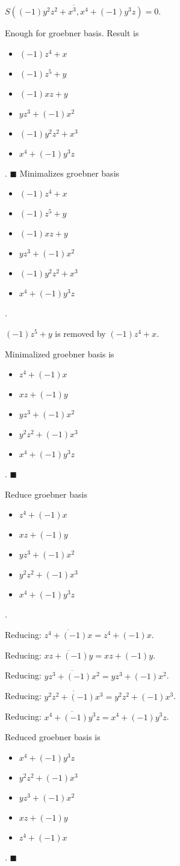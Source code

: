 $\overline{S((-1)y^{2}z^{2}+x^{3}, x^{4}+(-1)y^{3}z)} = 0$.

Enough for groebner basis.  Result is \begin{itemize}
\item $(-1)z^{4}+x$
\item $(-1)z^{5}+y$
\item $(-1)xz+y$
\item $yz^{3}+(-1)x^{2}$
\item $(-1)y^{2}z^{2}+x^{3}$
\item $x^{4}+(-1)y^{3}z$
\end{itemize}  .
$\blacksquare{}$
Minimalizes groebner basis
\begin{itemize}
\item $(-1)z^{4}+x$
\item $(-1)z^{5}+y$
\item $(-1)xz+y$
\item $yz^{3}+(-1)x^{2}$
\item $(-1)y^{2}z^{2}+x^{3}$
\item $x^{4}+(-1)y^{3}z$
\end{itemize}  .


$(-1)z^{5}+y$ is removed by $(-1)z^{4}+x$.

Minimalized groebner basis is
\begin{itemize}
\item $z^{4}+(-1)x$
\item $xz+(-1)y$
\item $yz^{3}+(-1)x^{2}$
\item $y^{2}z^{2}+(-1)x^{3}$
\item $x^{4}+(-1)y^{3}z$
\end{itemize}  .
$\blacksquare{}$

Reduce groebner basis
\begin{itemize}
\item $z^{4}+(-1)x$
\item $xz+(-1)y$
\item $yz^{3}+(-1)x^{2}$
\item $y^{2}z^{2}+(-1)x^{3}$
\item $x^{4}+(-1)y^{3}z$
\end{itemize}  .


Reducing: $\overline{z^{4}+(-1)x} = z^{4}+(-1)x$.

Reducing: $\overline{xz+(-1)y} = xz+(-1)y$.

Reducing: $\overline{yz^{3}+(-1)x^{2}} = yz^{3}+(-1)x^{2}$.

Reducing: $\overline{y^{2}z^{2}+(-1)x^{3}} = y^{2}z^{2}+(-1)x^{3}$.

Reducing: $\overline{x^{4}+(-1)y^{3}z} = x^{4}+(-1)y^{3}z$.

Reduced groebner basis is
\begin{itemize}
\item $x^{4}+(-1)y^{3}z$
\item $y^{2}z^{2}+(-1)x^{3}$
\item $yz^{3}+(-1)x^{2}$
\item $xz+(-1)y$
\item $z^{4}+(-1)x$
\end{itemize}  .
$\blacksquare{}$
